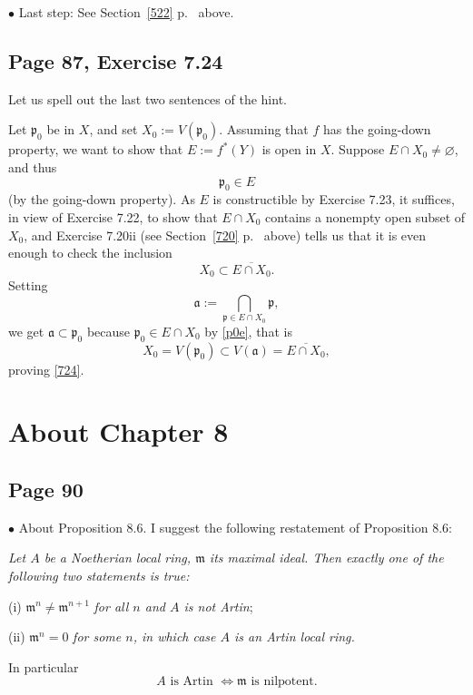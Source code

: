 \documentclass[parskip=half,fontsize=12pt]{scrartcl}%
\newcommand{\mf}{\mathfrak}
\newcommand{\aaa}{\mf a}
\newcommand{\ppp}{\mf p}
\newcommand{\bu}{\bullet}
\begin{document}
$\bu$ Last step: See Section~\ref{522} p.~\pageref{522} above.

\subsection{Page 87, Exercise 7.24}%

Let us spell out the last two sentences of the hint.

Let $\ppp_0$ be in $X$, and set $X_0:=V(\ppp_0)$. Assuming that $f$ has the going-down property, we want to show that $E:=f^*(Y)$ is open in $X$. Suppose $E\cap X_0\ne\varnothing$, and thus 
\begin{equation}\label{p0e}
\ppp_0\in E
\end{equation} 
(by the going-down property). As $E$ is constructible by Exercise 7.23, it suffices, in view of Exercise 7.22, to show that $E\cap X_0$ contains a nonempty open subset of $X_0$, and Exercise 7.20ii (see Section~\ref{720} p.~\pageref{720} above) tells us that it is even enough to check the inclusion 
\begin{equation}\label{724}
X_0\subset\overline{E\cap X_0}.
\end{equation} 
Setting 
$$
\aaa:=\bigcap_{\ppp\in E\cap X_0}\ppp,
$$ 
we get $\aaa\subset\ppp_0$ because $\ppp_0\in E\cap X_0$ by \eqref{p0e}, that is 
$$
X_0=V(\ppp_0)\subset V(\aaa)=\overline{E\cap X_0},
$$ 
proving \eqref{724}.

\section{About Chapter 8}%

\subsection{Page 90}\label{90}%

$\bu$ About Proposition 8.6. I suggest the following restatement of Proposition 8.6:

\emph{Let $A$ be a Noetherian local ring, $\mf m$ its maximal ideal. Then exactly one of the following two statements is true:}

(i) $\mf m^n\ne\mf m^{n+1}$ \emph{for all $n$ and $A$ is \emph{not} Artin};

(ii) $\mf m^n=0$ \emph{for some $n$, in which case $A$ is an Artin local ring.}

In particular 
\begin{equation}\label{86}
A\text{ is Artin $\iff\mf m$ is nilpotent.}
\end{equation}%
\end{document}
